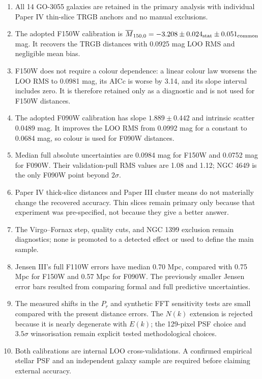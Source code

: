 \documentclass[nodoi,nocopyright]{pas}
\newcommand{\Mbar}{\overline{M}}
\begin{document}
\begin{enumerate}
\item All 14 GO-3055 galaxies are retained in the primary analysis with
individual Paper IV thin-slice TRGB anchors and no manual exclusions.
\item The adopted F150W calibration is
$\Mbar_{150,0}=-3.208\pm0.024_{\rm stat}\pm0.051_{\rm common}$ mag. It
recovers the TRGB distances with 0.0925 mag LOO RMS and
negligible mean bias.
\item F150W does not require a colour dependence: a linear colour law worsens
the LOO RMS to 0.0981 mag, its AICc is worse by 3.14, and its slope interval
includes zero. It is therefore retained only as a diagnostic and is not used
for F150W distances.
\item The adopted F090W calibration has slope $1.889\pm0.442$ and intrinsic
scatter 0.0489 mag. It improves the LOO RMS from 0.0992 mag for a constant to
0.0684 mag, so colour is used for F090W distances.
\item Median full absolute uncertainties are 0.0984 mag for F150W and
0.0752 mag for F090W. Their validation-pull RMS values are 1.08 and 1.12;
NGC 4649 is the only F090W point beyond $2\sigma$.
\item Paper IV thick-slice distances and Paper III cluster means do not
materially change the recovered accuracy. Thin slices remain primary only
because that experiment was pre-specified, not because they give a better
answer.
\item The Virgo--Fornax step, quality cuts, and NGC 1399 exclusion remain
diagnostics; none
is promoted to a detected effect or used to define the main sample.
\item Jensen III's full F110W errors have median 0.70 Mpc, compared with
0.75 Mpc for F150W and 0.57 Mpc for F090W. The previously smaller Jensen
error bars resulted from comparing formal and full predictive uncertainties.
\item The measured shifts in the $P_r$ and synthetic FFT sensitivity tests
are small compared with the present distance errors.
The $N(k)$ extension is rejected because it is nearly degenerate with $E(k)$;
the 129-pixel PSF choice and $3.5\sigma$ winsorisation remain explicit tested
methodological choices.
\item Both calibrations are internal LOO cross-validations. A confirmed
empirical stellar PSF and an independent galaxy sample are required before
claiming external accuracy.
\end{enumerate}
\end{document}
